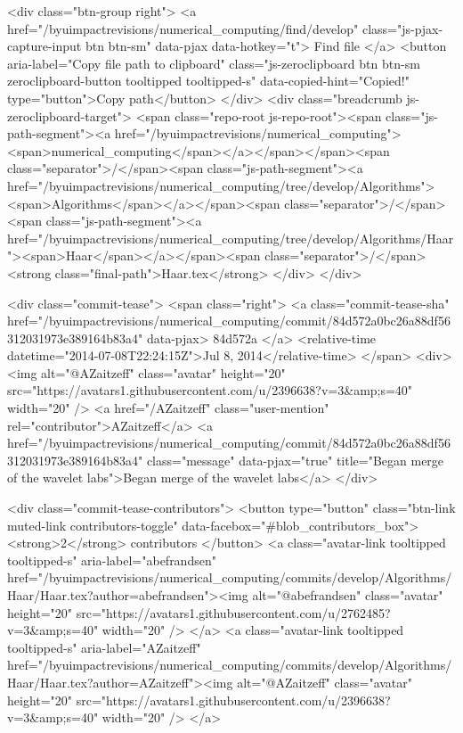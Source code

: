   <div class="btn-group right">
    <a href="/byuimpactrevisions/numerical_computing/find/develop"
          class="js-pjax-capture-input btn btn-sm"
          data-pjax
          data-hotkey="t">
      Find file
    </a>
    <button aria-label="Copy file path to clipboard" class="js-zeroclipboard btn btn-sm zeroclipboard-button tooltipped tooltipped-s" data-copied-hint="Copied!" type="button">Copy path</button>
  </div>
  <div class="breadcrumb js-zeroclipboard-target">
    <span class="repo-root js-repo-root"><span class="js-path-segment"><a href="/byuimpactrevisions/numerical_computing"><span>numerical_computing</span></a></span></span><span class="separator">/</span><span class="js-path-segment"><a href="/byuimpactrevisions/numerical_computing/tree/develop/Algorithms"><span>Algorithms</span></a></span><span class="separator">/</span><span class="js-path-segment"><a href="/byuimpactrevisions/numerical_computing/tree/develop/Algorithms/Haar"><span>Haar</span></a></span><span class="separator">/</span><strong class="final-path">Haar.tex</strong>
  </div>
</div>


  <div class="commit-tease">
      <span class="right">
        <a class="commit-tease-sha" href="/byuimpactrevisions/numerical_computing/commit/84d572a0bc26a88df56312031973e389164b83a4" data-pjax>
          84d572a
        </a>
        <relative-time datetime="2014-07-08T22:24:15Z">Jul 8, 2014</relative-time>
      </span>
      <div>
        <img alt="@AZaitzeff" class="avatar" height="20" src="https://avatars1.githubusercontent.com/u/2396638?v=3&amp;s=40" width="20" />
        <a href="/AZaitzeff" class="user-mention" rel="contributor">AZaitzeff</a>
          <a href="/byuimpactrevisions/numerical_computing/commit/84d572a0bc26a88df56312031973e389164b83a4" class="message" data-pjax="true" title="Began merge of the wavelet labs">Began merge of the wavelet labs</a>
      </div>

    <div class="commit-tease-contributors">
      <button type="button" class="btn-link muted-link contributors-toggle" data-facebox="#blob_contributors_box">
        <strong>2</strong>
         contributors
      </button>
          <a class="avatar-link tooltipped tooltipped-s" aria-label="abefrandsen" href="/byuimpactrevisions/numerical_computing/commits/develop/Algorithms/Haar/Haar.tex?author=abefrandsen"><img alt="@abefrandsen" class="avatar" height="20" src="https://avatars1.githubusercontent.com/u/2762485?v=3&amp;s=40" width="20" /> </a>
    <a class="avatar-link tooltipped tooltipped-s" aria-label="AZaitzeff" href="/byuimpactrevisions/numerical_computing/commits/develop/Algorithms/Haar/Haar.tex?author=AZaitzeff"><img alt="@AZaitzeff" class="avatar" height="20" src="https://avatars1.githubusercontent.com/u/2396638?v=3&amp;s=40" width="20" /> </a>


